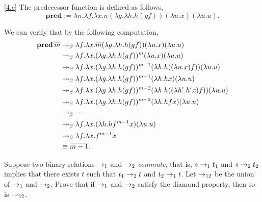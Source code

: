 \documentclass{homework}
\begin{document}
\begin{solution}
  \ref{4.c} The predecessor function is defined as follows,
  \begin{equation*}
    \mathbf{pred} := \lambda n.\lambda f.\lambda x.n(\lambda g.\lambda h.h(gf))(\lambda u.x)(\lambda u.u).
  \end{equation*}

  We can verify that by the following computation,
  \begin{align*}
    \mathbf{pred}\, \overline{m} &\twoheadrightarrow_{\beta} \lambda f.\lambda x.\overline{m}(\lambda g.\lambda h.h(gf))(\lambda u.x)(\lambda u.u) \\
    &\twoheadrightarrow_{\beta} \lambda f.\lambda x.(\lambda g.\lambda h.h(gf))^m(\lambda u.x)(\lambda u.u) \\
    &\twoheadrightarrow_{\beta} \lambda f.\lambda x.(\lambda g.\lambda h.h(gf))^{m-1}(\lambda h.h((\lambda u.x) f))(\lambda u.u) \\
    &\twoheadrightarrow_{\beta} \lambda f.\lambda x.(\lambda g.\lambda h.h(gf))^{m-1}(\lambda h.hx)(\lambda u.u) \\
    &\twoheadrightarrow_{\beta} \lambda f.\lambda x.(\lambda g.\lambda h.h(gf))^{m-2}(\lambda h.h((\lambda h'.h'x)f))(\lambda u.u) \\
    &\twoheadrightarrow_{\beta} \lambda f.\lambda x.(\lambda g.\lambda h.h(gf))^{m-2}(\lambda h.hfx)(\lambda u.u) \\
    &\twoheadrightarrow_{\beta} \cdots \\
    &\twoheadrightarrow_{\beta} \lambda f.\lambda x.(\lambda h.hf^{m-1}x)(\lambda u.u) \\
    &\twoheadrightarrow_{\beta} \lambda f.\lambda x.f^{m-1}x \\
    &\equiv \overline{m-1}.
  \end{align*}

\end{solution}

\begin{problem}
  Suppose two binary relations $\rightarrow_{1}$ and $\rightarrow_{2}$ \emph{commute},
  that is, $s \rightarrow_{1} t_{1}$ and $s \rightarrow_{2} t_{2}$ implies that there exists
  $t$ such that $t_{1} \rightarrow_{2} t$ and $t_{2} \rightarrow_{1} t$.
  Let $\rightarrow_{12}$ be the union of $\rightarrow_{1}$ and $\rightarrow_{2}$.
  Prove that if $\rightarrow_{1}$ and $\rightarrow_{2}$ satisfy the diamond property, then so
  is $\twoheadrightarrow_{12}$.
\end{problem}
\end{document}
